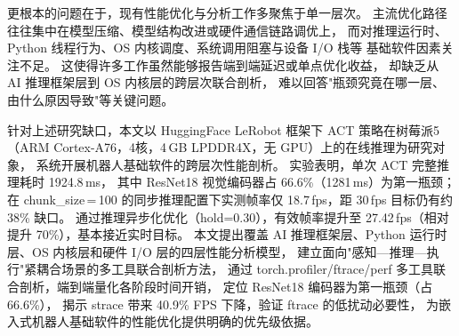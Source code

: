 更根本的问题在于，现有性能优化与分析工作多聚焦于单一层次。
主流优化路径往往集中在模型压缩、模型结构改进或硬件通信链路调优上，
而对推理运行时、Python 线程行为、OS 内核调度、系统调用阻塞与设备 I/O 栈等
基础软件因素关注不足。
这使得许多工作虽然能够报告端到端延迟或单点优化收益，
却缺乏从 AI 推理框架层到 OS 内核层的跨层次联合剖析，
难以回答"瓶颈究竟在哪一层、由什么原因导致"等关键问题。

针对上述研究缺口，本文以 HuggingFace LeRobot 框架\cite{lerobot}下
ACT 策略在树莓派5（ARM Cortex-A76，4核，4\,GB LPDDR4X，无 GPU）上的在线推理为研究对象，
系统开展机器人基础软件的跨层次性能剖析。
实验表明，单次 ACT 完整推理耗时 1924.8\,ms，
其中 ResNet18 视觉编码器占 66.6\%（1281\,ms）为第一瓶颈；
在 chunk\_size\,=\,100 的同步推理配置下实测帧率仅 18.7\,fps，距 30\,fps 目标仍有约 38\% 缺口。
通过推理异步化优化（hold=0.30），有效帧率提升至 27.42\,fps（相对提升 70\%），基本接近实时目标。
本文提出覆盖 AI 推理框架层、Python 运行时层、OS 内核层和硬件 I/O 层的四层性能分析模型，
建立面向"感知—推理—执行"紧耦合场景的多工具联合剖析方法，
通过 torch.profiler/ftrace/perf 多工具联合剖析，端到端量化各阶段时间开销，
定位 ResNet18 编码器为第一瓶颈（占 66.6\%），
揭示 strace 带来 40.9\% FPS 下降，验证 ftrace 的低扰动必要性，
为嵌入式机器人基础软件的性能优化提供明确的优先级依据。
